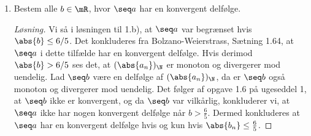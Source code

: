 \begin{opg}
\begin{enumerate}
    
    \item Bestem alle $b\in\mR$, hvor $\seq a$ har en konvergent delfølge.
    \ifanswers \begin{proof}[Løsning]
    	Vi så i løsningen til 1.b), at $ \seq a $ var begrænset hvis $ \abs{b}\leq 6/5 $. Det konkluderes fra Bolzano-Weierstrass, Sætning 1.64, at $ \seq a $ i dette tilfælde har en konvergent delfølge. Hvis derimod $ \abs{b}>6/5 $ ses det, at $ (\abs{a_n})_{\N} $ er monoton og divergerer mod uendelig. Lad $ \seq b $ være en delfølge af $ (\abs{a_n})_{\N} $, da er $ \seq b $ også monoton og divergerer mod uendelig. Det følger af opgave 1.6 på ugeseddel 1, at $ \seq b $ ikke er konvergent, og da $ \seq b $ var vilkårlig, konkluderer vi, at $ \seq a $ ikke har nogen konvergent delfølge når $ b>\frac{6}{5} $. Dermed konkluderes at $ \seq a $ har en konvergent delfølge hvis og kun hvis $ \abs{b_n}\leq \frac{6}{5} $. 
    \end{proof} \fi

\end{enumerate}
\end{opg}
